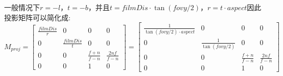 一般情况下$r = -l$，$t = -b$，并且$t=filmDis \cdot \tan{(fovy/2)}$，$r=t \cdot aspect$因此投影矩阵可以简化成:
\begin{displaymath}
M_{proj} = 
\begin{bmatrix}
\frac{filmDis}{r} & 0 & 0 & 0\\
0 & \frac{filmDis}{t} & 0 & 0\\
0 & 0 & \frac{f + n}{f - n} & \frac{2nf}{f - n}\\
0 & 0 & 1 & 0
\end{bmatrix} = 
\begin{bmatrix}
\frac{1}{\tan{(fovy/2)} \cdot aspect} & 0 & 0 & 0\\
0 & \frac{1}{\tan{(fovy/2)}} & 0 & 0\\
0 & 0 & \frac{f + n}{f - n} & \frac{2nf}{f - n}\\
0 & 0 & 1 & 0
\end{bmatrix}
\end{displaymath}